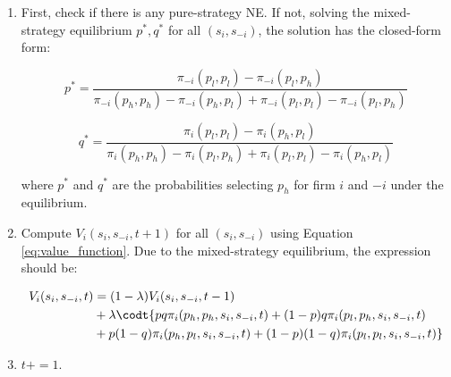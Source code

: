 \documentclass[12pt,letterpaper]{article}
\begin{document}
\begin{enumerate}
\begin{enumerate}
        \begin{table}[h]
            \centering
            \begin{tabular}{|c|c|c|}
                \hline
                \textbf{Firm $i$} / \textbf{Firm $-i$} & $p_h$ & $p_l$ \\
                \hline
                $p_h$ & $\pi_i(p_h,p_h), \pi_{-i}(p_h,p_h)$ & $\pi_i(p_h,p_l), \pi_{-i}(p_h,p_l)$ \\
                \hline
                $p_l$ & $\pi_i(p_l,p_h), \pi_{-i}(p_l, p_h)$ & $\pi_i(p_l,p_l), \pi_{-i}(p_l,p_l)$ \\
                \hline
            \end{tabular}
            \caption{Payoff Matrix given $s_i,s_{-i}, t$}
            \label{tab:payoff1}
        \end{table}
        
        where the payoff is defined by Equations \ref{eq:revenue_pair};
        \item First, check if there is any pure-strategy NE. If not, solving the mixed-strategy equilibrium $p^*, q^*$ for all $(s_i, s_{-i})$, the solution has the closed-form form:

        \[
            p^* = \frac{\pi_{-i}(p_l,p_l)-\pi_{-i}(p_l,p_h)}{\pi_{-i}(p_h,p_h)-\pi_{-i}(p_h,p_l)+\pi_{-i}(p_l,p_l)-\pi_{-i}(p_l,p_h)}
        \]
        
        \[
            q^* = \frac{\pi_{i}(p_l,p_l)-\pi_{i}(p_h,p_l)}{\pi_{i}(p_h,p_h)-\pi_{i}(p_l,p_h)+\pi_{i}(p_l,p_l)-\pi_{i}(p_h,p_l)}
        \]
        
        where $p^*$ and $q^*$ are the probabilities selecting $p_h$ for firm $i$ and $-i$ under the equilibrium.
        \item Compute $V_i(s_i, s_{-i}, t+1)$ for all $(s_i, s_{-i})$ using Equation \ref{eq:value_function}. Due to the mixed-strategy equilibrium, the expression should be:

        \[
            \begin{align}
                V_i(s_i,s_{-i},t) & = (1-\lambda)V_i(s_i,s_{-i},t-1) \\
                & + \lambda \codt \{pq \pi_i(p_h,p_h,s_i,s_{-i},t) + (1-p)q \pi_i(p_l,p_h,s_i,s_{-i},t) \\
                & + p(1-q) \pi_i(p_h,p_l,s_i,s_{-i},t) + (1-p)(1-q) \pi_i(p_l,p_l,s_i,s_{-i},t) \}
            \end{align}
        \]
        \item $t+=1$.
    \end{enumerate}
\end{enumerate}
\end{document}
